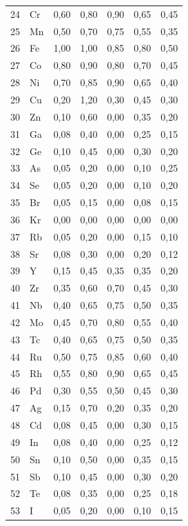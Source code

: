 \documentclass[12pt,a4paper]{article}
\begin{document}
\begin{longtable}{p{2.2cm}p{1.2cm}p{2.2cm}p{2.2cm}p{2.2cm}p{2.2cm}p{2.2cm}}
		24 & Cr  & 0,60 & 0,80 & 0,90 & 0,65 & 0,45 \\
		25 & Mn  & 0,50 & 0,70 & 0,75 & 0,55 & 0,35 \\
		26 & Fe  & 1,00 & 1,00 & 0,85 & 0,80 & 0,50 \\
		27 & Co  & 0,80 & 0,90 & 0,80 & 0,70 & 0,45 \\
		28 & Ni  & 0,70 & 0,85 & 0,90 & 0,65 & 0,40 \\
		29 & Cu  & 0,20 & 1,20 & 0,30 & 0,45 & 0,30 \\
		30 & Zn  & 0,10 & 0,60 & 0,00 & 0,35 & 0,20 \\
		31 & Ga  & 0,08 & 0,40 & 0,00 & 0,25 & 0,15 \\
		32 & Ge  & 0,10 & 0,45 & 0,00 & 0,30 & 0,20 \\
		33 & As  & 0,05 & 0,20 & 0,00 & 0,10 & 0,25 \\
		34 & Se  & 0,05 & 0,20 & 0,00 & 0,10 & 0,20 \\
		35 & Br  & 0,05 & 0,15 & 0,00 & 0,08 & 0,15 \\
		36 & Kr  & 0,00 & 0,00 & 0,00 & 0,00 & 0,00 \\
		37 & Rb  & 0,05 & 0,20 & 0,00 & 0,15 & 0,10 \\
		38 & Sr  & 0,08 & 0,30 & 0,00 & 0,20 & 0,12 \\
		39 & Y   & 0,15 & 0,45 & 0,35 & 0,35 & 0,20 \\
		40 & Zr  & 0,35 & 0,60 & 0,70 & 0,45 & 0,30 \\
		41 & Nb  & 0,40 & 0,65 & 0,75 & 0,50 & 0,35 \\
		42 & Mo  & 0,45 & 0,70 & 0,80 & 0,55 & 0,40 \\
		43 & Tc  & 0,40 & 0,65 & 0,75 & 0,50 & 0,35 \\
		44 & Ru  & 0,50 & 0,75 & 0,85 & 0,60 & 0,40 \\
		45 & Rh  & 0,55 & 0,80 & 0,90 & 0,65 & 0,45 \\
		46 & Pd  & 0,30 & 0,55 & 0,50 & 0,45 & 0,30 \\
		47 & Ag  & 0,15 & 0,70 & 0,20 & 0,35 & 0,20 \\
		48 & Cd  & 0,08 & 0,45 & 0,00 & 0,30 & 0,15 \\
		49 & In  & 0,08 & 0,40 & 0,00 & 0,25 & 0,12 \\
		50 & Sn  & 0,10 & 0,50 & 0,00 & 0,35 & 0,15 \\
		51 & Sb  & 0,10 & 0,45 & 0,00 & 0,30 & 0,20 \\
		52 & Te  & 0,08 & 0,35 & 0,00 & 0,25 & 0,18 \\
		53 & I   & 0,05 & 0,20 & 0,00 & 0,10 & 0,15 \\

\end{longtable}
\end{document}
